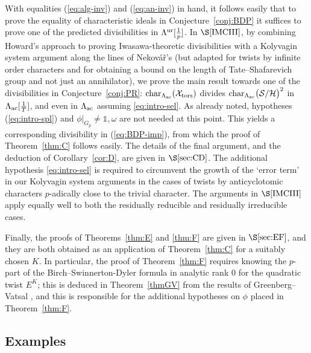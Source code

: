 With equalities (\ref{eq:alg-inv}) and (\ref{eq:an-inv}) in hand,
it follows easily that to prove  the equality of characteristic ideals in Conjecture~\ref{conj:BDP} it suffices to prove one of the predicted divisibilities in $\Lambda^{\rm ur}[\frac{1}{p}]$. In $\S\ref{IMCIII}$,
{by combining Howard's approach to proving Iwasawa-theoretic divisibilities \cite{howard} with a Kolyvagin system argument along the lines of
Nekov\'a\v{r}'s \cite{nekovar} (but adapted for twists by infinite order characters and for obtaining a bound on the length of Tate--Shafarevich group and not just an annihilator),}
we prove the main result towards one of the divisibilities in Conjecture~\ref{conj:PR}:
{${\rm char}_{\Lambda_{\rm ac}}(\mathcal{X}_{\rm tors})$ divides ${\rm char}_{\Lambda_{\rm ac}}\bigl(\mathcal{S}/\mathcal{H}\bigr)^2$ in
$\Lambda_{\rm ac}[\frac{1}{T}]$, and even in
$\Lambda_{\rm ac}$ assuming \eqref{eq:intro-sel}.} As already noted, hypotheses (\ref{eq:intro-spl}) and $\phi\vert_{G_p}\neq\mathds{1},\omega$ are not needed at this point.
This yields a corresponding divisibility in (\ref{eq:BDP-imp}), from which the proof of Theorem~\ref{thm:C} follows easily. The details of the final argument, and the deduction of Corollary~\ref{cor:D}, are given in $\S\ref{sec:CD}$.
The additional hypothesis \eqref{eq:intro-sel} is required to circumvent the growth of the
`error term' in our
Kolyvagin system arguments in the cases of twists by anticyclotomic characters
$p$-adically close to the trivial character. {The arguments in $\S\ref{IMCIII}$ apply equally well to both the residually reducible and residually irreducible cases.}

Finally, the proofs of Theorems~\ref{thm:E} and \ref{thm:F} are given in $\S\ref{sec:EF}$, %
and they are both obtained as an application of Theorem~\ref{thm:C} for a suitably chosen $K$. In particular, the proof of Theorem~\ref{thm:F} requires knowing the $p$-part of the Birch--Swinnerton-Dyler formula in analytic rank $0$
for the quadratic twist $E^K$; this is deduced in Theorem~\ref{thmGV} from the results of Greenberg--Vatsal \cite{greenvats}, and this is responsible for the additional hypotheses on $\phi$ placed in Theorem~\ref{thm:F}.


\subsection{Examples}

